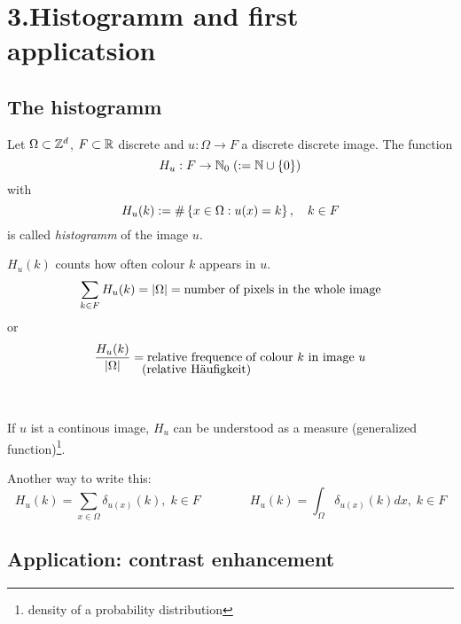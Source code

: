\chapter{3.Histogramm and first applicatsion}
\section{The histogramm}
%
%
\begin{definition}[histogram]
	Let $\Omega \subset \mathbb{Z}^d$, $F\subset \mathbb{R}$ discrete and 
 	$u: \Omega \to F$ a discrete discrete image. 
 	The function 
 		$$ H_u : F \to \mathbb{N}_0 \; (:= \mathbb{N} \cup \left\{0\right\})$$
 	with 
	$$ H_u (k) := \# \left\{ x\in \Omega: 
		u(x) = k\right\}, \quad k\in F$$
	is called \emph{histogramm} of the image $u$.
\end{definition}

%
%
$H_u(k)$ counts how often colour $k$ appears in $u$.
%
	$$ \sum_{k\in F} H_u (k) = |\Omega| 
		= \hbox{number of pixels in the whole  image}$$
or
%
	$$ {H_u(k) \over |\Omega|} = 
		\hbox{relative frequence$%
			_{\lower0.84em\hbox{\hskip-8.1em (relative Häufigkeit)}}$ 
				 \hskip-.8em \hbox{of colour $k$ in image $u$}} $$

\begin{bsp}\ 
	\HistogrammEx
\end{bsp}

If $u$ ist a continous image, $H_u$ can be understood as a
measure (generalized function)\footnote{density
of a probability distribution}. 

\newcommand{\underarrow}[2]{%
	\newlength{\widthA}
	\newlength{\widthB}
	\settowidth{\widthA}{#1}
	\settowidth{\widthB}{#2}
	\vbox{1\widthA}{#1\\ \hskip-2em\parbox{\widthB}{$\uparrow$\\#2}}
}
{\small 
	Another way to write this:
	\[ H_u(k) = \sum_{x\in \Omega} 
	\delta _{u(x)}(k),\;
		k \in F \qquad \qquad
		H_u (k) = \int_{\Omega} \delta_{u(x)}(k) dx, \;
		k\in F\]
}


\section{Application: contrast enhancement}

